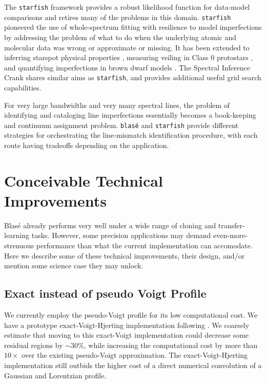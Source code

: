\documentclass[twocolumn]{aastex631}
\begin{document}
The \texttt{starfish} framework \citep{czekala15} provides a robust likelihood function for data-model comparisons and retires many of the problems in this domain.  \texttt{starfish} pioneered the use of whole-spectrum fitting with resilience to model imperfections by addressing the problem of what to do when the underlying atomic and molecular data was wrong or approximate or missing.  It has been extended to inferring starspot physical properties \citep{2017ApJ...836..200G}, measuring veiling in Class 0 protostars \citep{2018ApJ...862...85G}, and quantifying imperfections in brown dwarf models \citep{2021ApJ...921...95Z}.  The Spectral Inference Crank \citep[\texttt{sick},][]{2016ApJS..223....8C} shares similar aims as \texttt{starfish}, and provides additional useful grid search capabilities.

For very large bandwidths and very many spectral lines, the problem of identifying and cataloging line imperfections essentially becomes a book-keeping and continuum assignment problem.  \texttt{blas\'e} and \texttt{starfish} provide different strategies for orchestrating the line-mismatch identification procedure, with each route having tradeoffs depending on the application.

\section{Conceivable Technical Improvements}\label{technicalInnovations}

Blas\'e already performs very well under a wide range of cloning and transfer-learning tasks.  However, some precision applications may demand even-more-strenuous performance than what the current implementation can accomodate.  Here we describe some of these technical improvements, their design, and/or mention some science case they may unlock.

\subsection{Exact instead of pseudo Voigt Profile}
We currently employ the pseudo-Voigt profile for its low computational cost.  We have a prototype exact-Voigt-Hjerting implementation following \citet{2022ApJS..258...31K}.  We coarsely estimate that moving to this exact-Voigt implementation could decrease some residual regions by $\sim 30\%$, while increasing the computational cost by more than $10\times$ over the existing pseudo-Voigt approximation.  The exact-Voigt-Hjerting implementation still outbids the higher cost of a direct numerical convolution of a Gaussian and Lorentzian profile.
\end{document}
